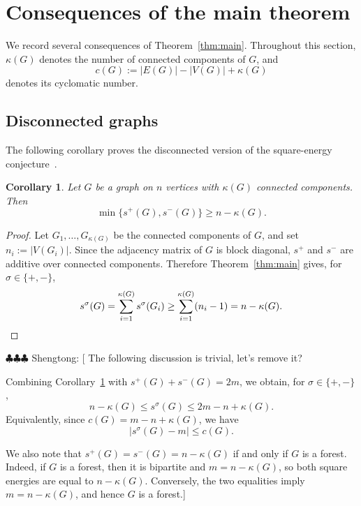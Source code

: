 \documentclass[11pt,letterpaper,reqno]{amsart}
\newtheorem{corollary}[theorem]{Corollary}
\theoremstyle{definition}
\newcommand{\shengtong}[1]{{
    \color{teal}
    \sf $\clubsuit\clubsuit\clubsuit$ Shengtong: [#1]}}
\begin{document}
\section{Consequences of the main theorem}\label{sec:consequences}

We record several consequences of Theorem~\ref{thm:main}.  Throughout this
section, $\kappa(G)$ denotes the number of connected components of $G$, and
\[
    c(G):=|E(G)|-|V(G)|+\kappa(G)
\]
denotes its cyclomatic number.

\subsection{Disconnected graphs}
The following corollary proves the disconnected version of the square-energy
conjecture~\cite[Conjecture~2]{EFGW}.

\begin{corollary}\label{cor:components}
Let $G$ be a graph on $n$ vertices with $\kappa(G)$ connected components.
Then
\[
    \min\{s^+(G),s^-(G)\}\ge n-\kappa(G).
\]
\end{corollary}

\begin{proof}
Let $G_1,\ldots,G_{\kappa(G)}$ be the connected components of $G$, and set
$n_i:=|V(G_i)|$.  Since the adjacency matrix of $G$ is block diagonal,
$s^+$ and $s^-$ are additive over connected components.  Therefore
Theorem~\ref{thm:main} gives, for $\sigma\in\{+,-\}$,
\[
    s^\sigma(G)
    =\sum_{i=1}^{\kappa(G)}s^\sigma(G_i)
    \ge\sum_{i=1}^{\kappa(G)}(n_i-1)
    =n-\kappa(G).
\qedhere\]
\end{proof}

\shengtong{
The following discussion is trivial, let's remove it? 

Combining Corollary~\ref{cor:components} with
$s^+(G)+s^-(G)=2m$, we obtain, for $\sigma\in\{+,-\}$,
\[
    n-\kappa(G)
    \le s^\sigma(G)
    \le 2m-n+\kappa(G).
\]
Equivalently, since $c(G)=m-n+\kappa(G)$, we have
\begin{equation}\label{eq:square-spread-ineq1}
    |s^\sigma(G)-m|\le c(G).
\end{equation}

We also note that $s^+(G)=s^-(G)=n-\kappa(G)$ if and only if $G$ is a forest.  Indeed, if $G$ is a forest, then it is
bipartite and $m=n-\kappa(G)$, so both square energies are equal to
$n-\kappa(G)$.  Conversely, the two equalities imply
$m=n-\kappa(G)$, and hence $G$ is a forest.}
\end{document}
